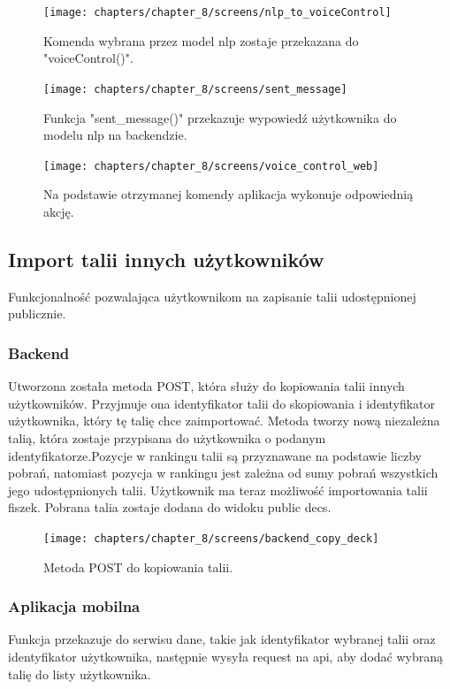 \begin{figure}[H]
    \centering
    \texttt{[image: chapters/chapter\_8/screens/nlp\_to\_voiceControl]}
    \caption{Komenda wybrana przez model nlp zostaje przekazana do "voiceControl()".}
    \label{img:nlp_to_voiceControl}
\end{figure}

\begin{figure}[H]
    \centering
    \texttt{[image: chapters/chapter\_8/screens/sent\_message]}
    \caption{Funkcja "sent\_message()" przekazuje wypowiedź użytkownika do modelu nlp na backendzie.}
    \label{img:sent_message}
\end{figure}

\begin{figure}[H]
    \centering
    \texttt{[image: chapters/chapter\_8/screens/voice\_control\_web]}
    \caption{Na podstawie otrzymanej komendy aplikacja wykonuje odpowiednią akcję.}
    \label{img:voice_control_web}
\end{figure}

\subsection{Import talii innych użytkowników}
Funkcjonalność pozwalająca użytkownikom na zapisanie talii udostępnionej publicznie.

\subsubsection{Backend}
Utworzona została metoda POST, która służy do kopiowania talii innych użytkowników. Przyjmuje ona identyfikator talii do skopiowania i identyfikator użytkownika, który tę talię chce zaimportować. Metoda tworzy nową niezależna talią, która zostaje przypisana do użytkownika o podanym identyfikatorze.Pozycje w rankingu talii są przyznawane na podstawie liczby pobrań, natomiast pozycja w rankingu jest zależna od sumy pobrań wszystkich jego udostępnionych talii. Użytkownik ma teraz możliwość importowania talii fiszek. Pobrana talia zostaje dodana do widoku public decs.

\begin{figure}[H]
    \centering
    \texttt{[image: chapters/chapter\_8/screens/backend\_copy\_deck]}
    \caption{Metoda POST do kopiowania talii.}
    \label{img:backend_copy_deck}
\end{figure}

\subsubsection{Aplikacja mobilna}
Funkcja przekazuje do serwisu dane, takie jak identyfikator wybranej talii oraz identyfikator użytkownika, następnie wysyła request na api, aby dodać wybraną talię do listy użytkownika.


